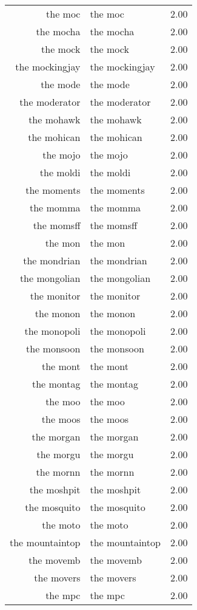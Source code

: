 \begin{table}[ht]
\begin{tabular}{rlr}
  the moc & the moc & 2.00 \\ 
  the mocha & the mocha & 2.00 \\ 
  the mock & the mock & 2.00 \\ 
  the mockingjay & the mockingjay & 2.00 \\ 
  the mode & the mode & 2.00 \\ 
  the moderator & the moderator & 2.00 \\ 
  the mohawk & the mohawk & 2.00 \\ 
  the mohican & the mohican & 2.00 \\ 
  the mojo & the mojo & 2.00 \\ 
  the moldi & the moldi & 2.00 \\ 
  the moments & the moments & 2.00 \\ 
  the momma & the momma & 2.00 \\ 
  the momsff & the momsff & 2.00 \\ 
  the mon & the mon & 2.00 \\ 
  the mondrian & the mondrian & 2.00 \\ 
  the mongolian & the mongolian & 2.00 \\ 
  the monitor & the monitor & 2.00 \\ 
  the monon & the monon & 2.00 \\ 
  the monopoli & the monopoli & 2.00 \\ 
  the monsoon & the monsoon & 2.00 \\ 
  the mont & the mont & 2.00 \\ 
  the montag & the montag & 2.00 \\ 
  the moo & the moo & 2.00 \\ 
  the moos & the moos & 2.00 \\ 
  the morgan & the morgan & 2.00 \\ 
  the morgu & the morgu & 2.00 \\ 
  the mornn & the mornn & 2.00 \\ 
  the moshpit & the moshpit & 2.00 \\ 
  the mosquito & the mosquito & 2.00 \\ 
  the moto & the moto & 2.00 \\ 
  the mountaintop & the mountaintop & 2.00 \\ 
  the movemb & the movemb & 2.00 \\ 
  the movers & the movers & 2.00 \\ 
  the mpc & the mpc & 2.00 \\ 

\end{tabular}
\end{table}
